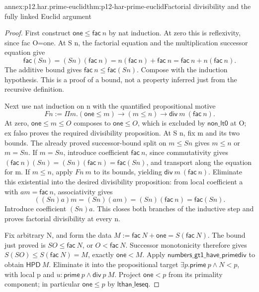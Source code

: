 \begin{annexitem}{annex:p12.har.prime-euclid}{thm:p12-har-prime-euclid}{Factorial divisibility and the fully linked Euclid argument}
\begin{proof}
First construct \(\mathsf{one}\le\mathsf{fac}\ n\) by nat
induction. At zero this is reflexivity, since fac O=one.
At S n, the factorial equation and the multiplication successor
equation give
\[
 \mathsf{fac}(S n)=(S n)(\mathsf{fac}\ n)
       =n(\mathsf{fac}\ n)+\mathsf{fac}\ n
       =\mathsf{fac}\ n+n(\mathsf{fac}\ n).
\]
The additive bound gives \(\mathsf{fac}\ n\le\mathsf{fac}(S n)\).
Compose with the induction hypothesis. This is a proof of a bound,
not a property inferred just from the recursive definition.

Next use nat induction on n with the quantified propositional motive
\[
 F n:=\Pi m.(\mathsf{one}\le m)\to(m\le n)\to
                 \mathsf{div}\ m\ (\mathsf{fac}\ n).
\]
At zero, \(\mathsf{one}\le m\le O\) composes to
\(\mathsf{one}\le O\), which is excluded by \(\mathsf{non\_lt0}\) at O;
ex falso proves the required divisibility proposition.
At S n, fix m and its two bounds. The already proved successor-bound
split on \(m\le S n\) gives \(m\le n\) or \(m=S n\).
If \(m=S n\), introduce coefficient \(\mathsf{fac}\ n\), since
commutativity gives
\((\mathsf{fac}\ n)(S n)=(S n)(\mathsf{fac}\ n)
=\mathsf{fac}(S n)\), and transport along the equation for m.
If \(m\le n\), apply \(F n\ m\) to its bounds, yielding
\(\mathsf{div}\ m\ (\mathsf{fac}\ n)\). Eliminate this
existential into the desired divisibility proposition: from local
coefficient a with \(am=\mathsf{fac}\ n\), associativity gives
\[
 ((S n)a)m=(S n)(am)=(S n)(\mathsf{fac}\ n)
                          =\mathsf{fac}(S n).
\]
Introduce coefficient \((S n)a\). This closes both branches of the
inductive step and proves factorial divisibility at every n.

Fix arbitrary N, and form the data
\(M:=\mathsf{fac}\ N+\mathsf{one}=S(\mathsf{fac}\ N)\).
The bound just proved is \(S O\le\mathsf{fac}\ N\), or
\(O<\mathsf{fac}\ N\). Successor monotonicity therefore gives
\(S(S O)\le S(\mathsf{fac}\ N)=M\), exactly
\(\mathsf{one}<M\). Apply \(\mathsf{numbers\_gt1\_have\_primediv}\) to obtain
\(\mathsf{HPD}\ M\). Eliminate it into the propositional target
\(\exists p.\mathsf{prime}\ p\wedge N<p\), with local p and
\(u:\mathsf{prime}\ p\wedge\mathsf{div}\ p\ M\).
Project \(\mathsf{one}<p\) from its primality component; in
particular \(\mathsf{one}\le p\) by \(\mathsf{lthan\_leseq}\).


\end{proof}
\end{annexitem}
